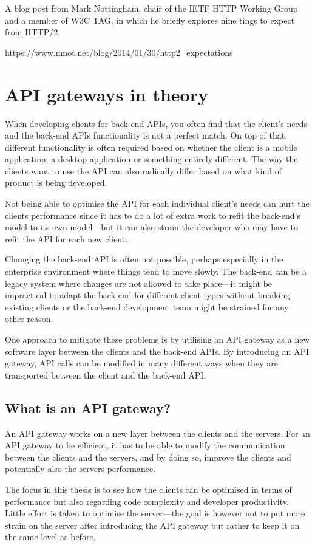 \documentclass{cslthse-msc}
\begin{document}
A blog post from Mark Nottingham, chair of the IETF HTTP Working Group and a member of W3C TAG, in which he briefly explores nine tings to expect from HTTP/2.

\noindent \url{https://www.mnot.net/blog/2014/01/30/http2_expectations}

\chapter{API gateways in theory}
When developing clients for back-end APIs, you often find that the client's needs and the back-end APIs functionality is not a perfect match. On top of that, different functionality is often required based on whether the client is a mobile application, a desktop application or something entirely different. The way the clients want to use the API can also radically differ based on what kind of product is being developed.

Not being able to optimise the API for each individual client's needs can hurt the clients performance since it has to do a lot of extra work to refit the back-end's model to its own model---but it can also strain the developer who may have to refit the API for each new client.

Changing the back-end API is often not possible, perhaps especially in the enterprise environment where things tend to move slowly. The back-end can be a legacy system where changes are not allowed to take place---it might be impractical to adapt the back-end for different client types without breaking existing clients or the back-end development team might be strained for any other reason.

One approach to mitigate these problems is by utilising an API gateway as a new software layer between the clients and the back-end APIs. By introducing an API gateway, API calls can be modified in many different ways when they are transported between the client and the back-end API.

\section{What is an API gateway?}
An API gateway works on a new layer between the clients and the servers. For an API gateway to be efficient, it has to be able to modify the communication between the clients and the servers, and by doing so, improve the clients and potentially also the servers performance.

The focus in this thesis is to see how the clients can be optimised in terms of performance but also regarding code complexity and developer productivity. Little effort is taken to optimise the server---the goal is however not to put more strain on the server after introducing the API gateway but rather to keep it on the same level as before.
\end{document}
